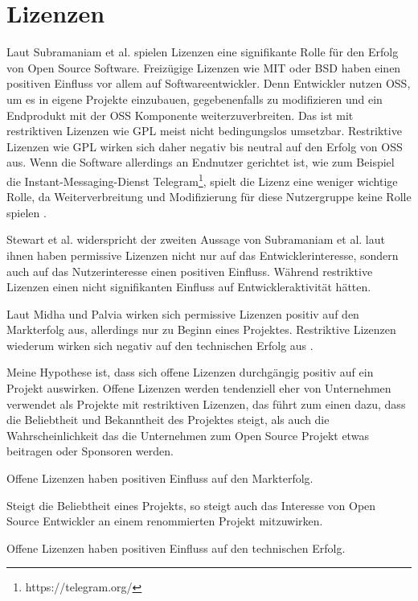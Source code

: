 \section{Lizenzen} \label{sec:Lizenzen}

Laut Subramaniam et al. spielen Lizenzen eine signifikante Rolle für den Erfolg von
Open Source Software.
Freizügige Lizenzen wie MIT oder BSD haben einen positiven Einfluss vor allem auf Softwareentwickler.
Denn Entwickler nutzen OSS, um es in eigene Projekte einzubauen, gegebenenfalls zu modifizieren
und ein Endprodukt mit der OSS Komponente weiterzuverbreiten. Das ist mit restriktiven Lizenzen
wie GPL meist nicht bedingungslos umsetzbar. Restriktive Lizenzen wie GPL wirken sich daher
negativ bis neutral auf den Erfolg von OSS aus. Wenn die Software allerdings an Endnutzer
gerichtet ist, wie zum Beispiel die Instant-Messaging-Dienst Telegram\footnote{https://telegram.org/},
spielt die Lizenz eine weniger wichtige Rolle, da Weiterverbreitung und Modifizierung für diese Nutzergruppe
keine Rolle spielen \cite{subramaniamDeterminantsOpenSource2009}.

Stewart et al. widerspricht der zweiten Aussage von Subramaniam et al. laut ihnen
haben permissive Lizenzen nicht nur auf das Entwicklerinteresse, sondern auch auf das
Nutzerinteresse einen positiven Einfluss. %
Während restriktive Lizenzen einen nicht signifikanten Einfluss auf
Entwickleraktivität hätten. \cite{stewartImpactsLicenseChoice2006a}

Laut Midha und Palvia wirken sich permissive Lizenzen positiv auf den Markterfolg aus, allerdings
nur zu Beginn eines Projektes. %
Restriktive Lizenzen wiederum wirken sich negativ auf den technischen Erfolg aus %
\cite{midhaFactorsAffectingSuccess2012}.


Meine Hypothese ist, dass sich offene Lizenzen durchgängig positiv auf ein Projekt auswirken.
Offene Lizenzen werden tendenziell eher von Unternehmen verwendet als Projekte mit restriktiven
Lizenzen, das führt zum einen dazu, dass die Beliebtheit und Bekanntheit des Projektes steigt, als
auch die Wahrscheinlichkeit das die Unternehmen zum Open Source Projekt etwas beitragen oder
Sponsoren werden.

\begin{hypothesis}
    Offene Lizenzen haben positiven Einfluss auf den Markterfolg.
    \label{H:1}
\end{hypothesis}

\noindent
Steigt die Beliebtheit eines Projekts, so steigt auch das Interesse von Open Source Entwickler an
einem renommierten Projekt mitzuwirken.

\begin{hypothesis}
    Offene Lizenzen haben positiven Einfluss auf den technischen Erfolg.
    \label{H:2}
\end{hypothesis}